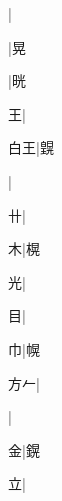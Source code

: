 \begin{multicols}{2}
{{\cjk{}{\cnsym{}　}{\cnsym{}　}{\cnsym{}　}}|{}\par
{\cjk{}{\cnsym{}　}{\cnsym{}　}{\cnsym{}　}}|{\cjk{}晃}\par
{\cjk{}{\cnsym{}　}{\cnsym{}　}{\cnsym{}　}}|{\cjk{}晄}\par
{\cjk{}{\cnsym{}　}{\cnsym{}　}王}|{}\par
{\cjk{}{\cnsym{}　}白王}|{\cjk{}皩}\par
{}|{}\par
{\cjk{}{\cnsym{}　}{\cnsym{}　}卄}|{}\par
{\cjk{}{\cnsym{}　}{\cnsym{}　}木}|{\cjk{}榥}\par
{\cjk{}{\cnsym{}　}{\cnsym{}　}光}|{}\par
{\cjk{}{\cnsym{}　}{\cnsym{}　}目}|{}\par
{\cjk{}{\cnsym{}　}{\cnsym{}　}巾}|{\cjk{}幌}\par
{\cjk{}{\cnsym{}　}方{\cnxHanaA{}𠂉}}|{}\par
{}|{}\par
{\cjk{}{\cnsym{}　}{\cnsym{}　}金}|{\cjk{}鎤}\par
{\cjk{}{\cnsym{}　}{\cnsym{}　}立}|{}\par
}
\end{multicols}
